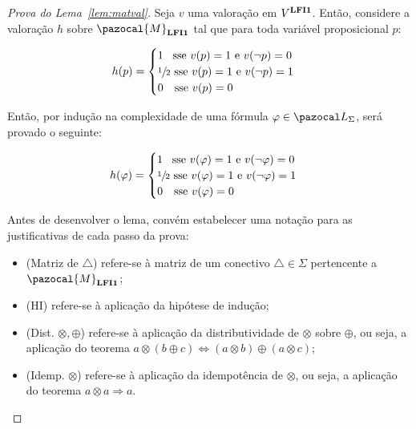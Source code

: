     \begin{proof}[Prova do Lema~\ref{lem:matval}]
        Seja $v$ uma valoração em $V^{{\normalfont\textbf{LFI1}}}$. Então, considere a valoração $h$ sobre $\pazocal{M}_{\lfium}$ tal que para toda variável proposicional $p$:
        \begin{center}
            \begin{equation*}
                h(p) =
                \begin{cases}
                  1\ \, \text{ sse } v(p) = 1 \text{ e } v(\neg p) = 0 \\
                  \sfrac{1}{2}{} \text{ sse } v(p) = 1 \text{ e } v(\neg p) = 1 \\
                  0\ \ \text{ sse } v(p) = 0
                \end{cases}
              \end{equation*}
        \end{center}
        
        
        Então, por indução na complexidade de uma fórmula $\phi \in \ling{}$, será provado o seguinte:
        \begin{center}
            \begin{equation*}
                h(\varphi) =
                \begin{cases}
                    1\ \,  \text{ sse } v(\varphi) = 1 \text{ e } v(\neg \varphi) = 0 \\
                    \sfrac{1}{2}{} \text{ sse } v(\varphi) = 1 \text{ e } v(\neg \varphi) = 1 \\
                    0\ \  \text{ sse } v(\varphi) = 0
                \end{cases}
            \end{equation*}
        \end{center}
        
        \begin{notacao}
            Antes de desenvolver o lema, convém estabelecer uma notação para as justificativas de cada passo da prova:

            \begin{itemize}
                \item (Matriz de $\triangle$) refere-se à matriz de um conectivo $\triangle \in \Sigma$ pertencente a $\pazocal{M}_{\lfium{}}$;
                \item (HI) refere-se à aplicação da hipótese de indução;
                \item (Dist. $\otimes, \oplus$) refere-se à aplicação da distributividade de $\otimes$ sobre $\oplus$, ou seja, a aplicação do teorema $a \otimes (b \oplus c) \Longleftrightarrow (a \otimes b) \oplus (a \otimes c)$;
                \item (Idemp. $\otimes$) refere-se à aplicação da idempotência de $\otimes$, ou seja, a aplicação do teorema $a \otimes a \Longrightarrow a$.
            \end{itemize}
        \end{notacao}


\end{proof}
